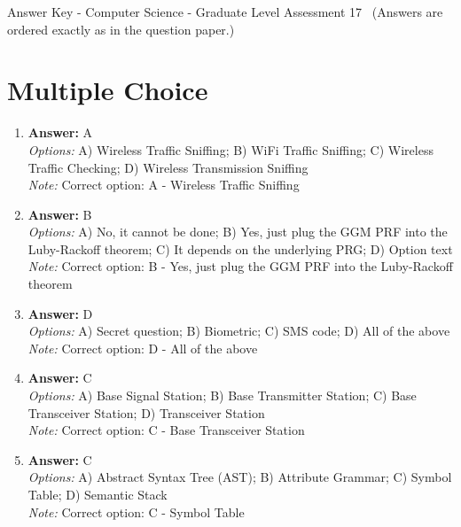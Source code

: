 \documentclass[12pt]{article}
\begin{document}
\begin{center}
Answer Key - Computer Science - Graduate Level Assessment 17 \
\small (Answers are ordered exactly as in the question paper.)
\end{center}

\section*{Multiple Choice}
\begin{enumerate}[label=\arabic*.]
\item \textbf{Answer:} A
\\ \textit{Options:} A) Wireless Traffic Sniffing; B) WiFi Traffic Sniffing; C) Wireless Traffic Checking; D) Wireless Transmission Sniffing
\\ \textit{Note:} Correct option: A - Wireless Traffic Sniffing
\item \textbf{Answer:} B
\\ \textit{Options:} A) No, it cannot be done; B) Yes, just plug the GGM PRF into the Luby-Rackoff theorem; C) It depends on the underlying PRG; D) Option text
\\ \textit{Note:} Correct option: B - Yes, just plug the GGM PRF into the Luby-Rackoff theorem
\item \textbf{Answer:} D
\\ \textit{Options:} A) Secret question; B) Biometric; C) SMS code; D) All of the above
\\ \textit{Note:} Correct option: D - All of the above
\item \textbf{Answer:} C
\\ \textit{Options:} A) Base Signal Station; B) Base Transmitter Station; C) Base Transceiver Station; D) Transceiver Station
\\ \textit{Note:} Correct option: C - Base Transceiver Station
\item \textbf{Answer:} C
\\ \textit{Options:} A) Abstract Syntax Tree (AST); B) Attribute Grammar; C) Symbol Table; D) Semantic Stack
\\ \textit{Note:} Correct option: C - Symbol Table
\end{enumerate}
\end{document}
